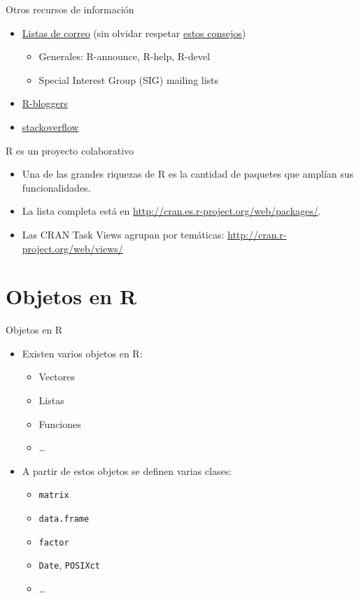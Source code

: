 \documentclass[xcolor={usenames,svgnames,dvipsnames}]{beamer}
\begin{document}
\begin{frame}[label={sec:org2b4a2d1}]{Otros recursos de información}
\begin{itemize}
\item \href{http://www.r-project.org/mail.html}{Listas de correo} (sin olvidar respetar \href{http://www.r-project.org/posting-guide.html}{estos consejos})
\begin{itemize}
\item Generales: R-announce, R-help, R-devel
\item Special Interest Group (SIG) mailing lists
\end{itemize}
\item \href{http://www.r-bloggers.com}{R-bloggers}
\item \href{http://stackoverflow.com/questions/tagged/r}{stackoverflow}
\end{itemize}
\end{frame}

\begin{frame}[label={sec:org241adfc}]{R es un proyecto colaborativo}
\begin{itemize}
\item Una de las grandes riquezas de R es la cantidad de paquetes que amplían sus funcionalidades.
\item La lista completa está en \url{http://cran.es.r-project.org/web/packages/}.
\item Las CRAN Task Views agrupan por temáticas:
\url{http://cran.r-project.org/web/views/}
\end{itemize}
\end{frame}

\section{Objetos en R}
\label{sec:org858ad5c}

\begin{frame}[fragile,label={sec:org8b07ec9}]{Objetos en R}
 \begin{itemize}
\item Existen varios objetos en R:
\begin{itemize}
\item Vectores
\item Listas
\item Funciones
\item \ldots{}
\end{itemize}
\item A partir de estos objetos se definen varias clases:
\begin{itemize}
\item \texttt{matrix}
\item \texttt{data.frame}
\item \texttt{factor}
\item \texttt{Date}, \texttt{POSIXct}
\item \ldots{}
\end{itemize}
\end{itemize}
\end{frame}
\end{document}
